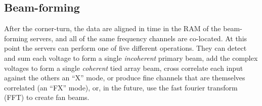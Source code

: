 \subsection{Beam-forming}

After the corner-turn, the data are aligned in time in the RAM of the beam-forming servers, and all of the same frequency channels are co-located. At this point the servers can perform one of five different operations. They can detect and sum each voltage to form a single \textit{incoherent} primary beam, add the complex voltages to form a single \textit{coherent} tied array beam, cross correlate each input against the others an ``X'' mode, or produce fine channels that are themselves correlated (an ``FX'' mode), or, in the future, use the fast fourier transform (FFT) to create fan beams. 